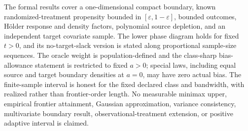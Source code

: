The formal results cover a one-dimensional compact boundary, known randomized-treatment propensity bounded in \([\varepsilon,1-\varepsilon]\), bounded outcomes, H\"older response and density factors, polynomial source depletion, and an independent target covariate sample. The lower phase diagram holds for fixed \(t>0\), and its no-target-slack version is stated along proportional sample-size sequences. The oracle weight is population-defined and the class-sharp bias-allowance statement is restricted to fixed \(a>0\); special laws, including equal source and target boundary densities at \(a=0\), may have zero actual bias. The finite-sample interval is honest for the fixed declared class and bandwidth, with realized rather than frontier-order length. No measurable minimax upper, empirical frontier attainment, Gaussian approximation, variance consistency, multivariate boundary result, observational-treatment extension, or positive adaptive interval is claimed.